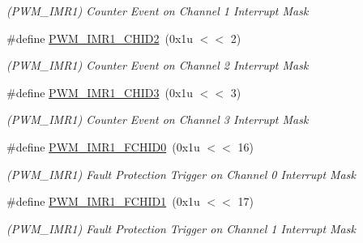 \begin{DoxyCompactItemize}
\begin{DoxyCompactList}\small\item\em (P\+W\+M\+\_\+\+I\+M\+R1) Counter Event on Channel 1 Interrupt Mask \end{DoxyCompactList}\item 
\mbox{\label{group__SAMS70__PWM_ga6f1acc4c35ff8edd7f942f7373df293c}} 
\#define \mbox{\hyperlink{group__SAMS70__PWM_ga6f1acc4c35ff8edd7f942f7373df293c}{P\+W\+M\+\_\+\+I\+M\+R1\+\_\+\+C\+H\+I\+D2}}~(0x1u $<$$<$ 2)
\begin{DoxyCompactList}\small\item\em (P\+W\+M\+\_\+\+I\+M\+R1) Counter Event on Channel 2 Interrupt Mask \end{DoxyCompactList}\item 
\mbox{\label{group__SAMS70__PWM_ga2e15587fb7becf372540aa69cb05eb80}} 
\#define \mbox{\hyperlink{group__SAMS70__PWM_ga2e15587fb7becf372540aa69cb05eb80}{P\+W\+M\+\_\+\+I\+M\+R1\+\_\+\+C\+H\+I\+D3}}~(0x1u $<$$<$ 3)
\begin{DoxyCompactList}\small\item\em (P\+W\+M\+\_\+\+I\+M\+R1) Counter Event on Channel 3 Interrupt Mask \end{DoxyCompactList}\item 
\mbox{\label{group__SAMS70__PWM_gaf36c2ed812ff1a0db8cdf19b99a638c5}} 
\#define \mbox{\hyperlink{group__SAMS70__PWM_gaf36c2ed812ff1a0db8cdf19b99a638c5}{P\+W\+M\+\_\+\+I\+M\+R1\+\_\+\+F\+C\+H\+I\+D0}}~(0x1u $<$$<$ 16)
\begin{DoxyCompactList}\small\item\em (P\+W\+M\+\_\+\+I\+M\+R1) Fault Protection Trigger on Channel 0 Interrupt Mask \end{DoxyCompactList}\item 
\mbox{\label{group__SAMS70__PWM_ga7b1b162661cc04e05022140e326c28de}} 
\#define \mbox{\hyperlink{group__SAMS70__PWM_ga7b1b162661cc04e05022140e326c28de}{P\+W\+M\+\_\+\+I\+M\+R1\+\_\+\+F\+C\+H\+I\+D1}}~(0x1u $<$$<$ 17)
\begin{DoxyCompactList}\small\item\em (P\+W\+M\+\_\+\+I\+M\+R1) Fault Protection Trigger on Channel 1 Interrupt Mask \end{DoxyCompactList}\item 

\end{DoxyCompactItemize}
